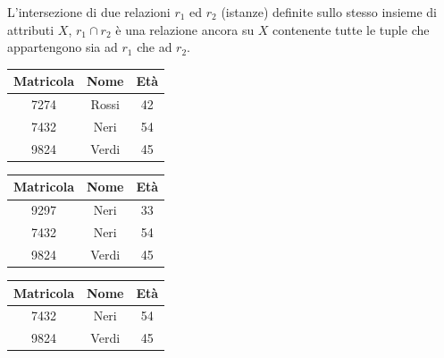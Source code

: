 \documentclass{article}
\begin{document}
\begin{itemize}
\begin{itemize}
        L'intersezione di due relazioni $r_1$ ed $r_2$ (istanze) definite sullo stesso insieme di attributi $X$, $r_1 \cap r_2$ è una relazione ancora su $X$ contenente tutte le tuple che appartengono sia ad $r_1$ che ad $r_2$.

         \begin{minipage}{.2\textwidth}
  \centering
            \begin{tabular}{|c|c|c|}
                 \hline
                 \textbf{Matricola} & \textbf{Nome} & \textbf{Età} \\
                 \hline
                 7274 & Rossi & 42 \\
                 \hline
                 7432 & Neri & 54\\
                 \hline
                 9824 & Verdi & 45 \\
                 \hline
            \end{tabular}
\end{minipage}%
\hfill
\begin{minipage}{.2\textwidth}
  \centering
           \begin{tabular}{|c|c|c|}
                 \hline
                 \textbf{Matricola} & \textbf{Nome} & \textbf{Età} \\
                 \hline
                 9297 & Neri & 33 \\
                 \hline
                 7432 & Neri & 54\\
                 \hline
                 9824 & Verdi & 45 \\
                 \hline
            \end{tabular}
\hspace{1em}
\end{minipage}
\hfill
\begin{minipage}{.3\textwidth}
  \centering
           \begin{tabular}{|c|c|c|}
                 \hline
                 \textbf{Matricola} & \textbf{Nome} & \textbf{Età} \\
                 \hline
                 7432 & Neri & 54\\
                 \hline
                 9824 & Verdi & 45 \\
                 \hline
            \end{tabular}
\hspace{1em}
\end{minipage}
        

\end{itemize}
\end{itemize}
\end{document}
